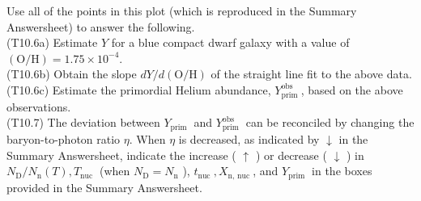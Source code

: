 \documentclass[10pt]{article}
\begin{document}
    Use all of the points in this plot (which is reproduced in the Summary Answersheet) to answer the following.\\
    (T10.6a) Estimate $Y$ for a blue compact dwarf galaxy with a value of $(\mathrm{O} / \mathrm{H})=1.75 \times 10^{-4}$.\\
    (T10.6b) Obtain the slope $d Y / d(\mathrm{O} / \mathrm{H})$ of the straight line fit to the above data.\\
    (T10.6c) Estimate the primordial Helium abundance, $Y_{\text {prim }}^{\text {obs }}$, based on the above observations.\\
    (T10.7) The deviation between $Y_{\text {prim }}$ and $Y_{\text {prim }}^{\text {obs }}$ can be reconciled by changing the baryon-to-photon ratio $\eta$. When $\eta$ is decreased, as indicated by $\downarrow$ in the Summary Answersheet, indicate the increase ( $\uparrow$ ) or decrease ( $\downarrow$ ) in $N_{\mathrm{D}} / N_{\mathrm{n}}(T), T_{\text {nuc }}$ (when $N_{\mathrm{D}}=N_{\mathrm{n}}$ ), $t_{\text {nuc }}, X_{\mathrm{n} \text {, nuc }}$, and $Y_{\text {prim }}$ in the boxes provided in the Summary Answersheet.
    
\end{document}
